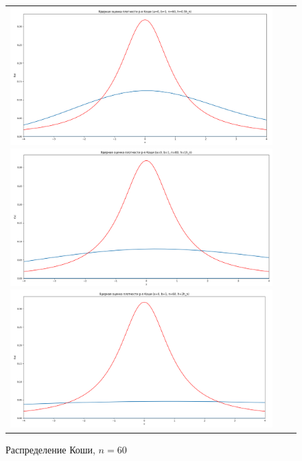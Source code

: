 \begin{figure}[H]
	\begin{tabular}{ccc}
		\includegraphics[scale=0.14]{resources/4_cauchy_60_half.png}
		\includegraphics[scale=0.14]{resources/4_cauchy_60_one.png}
		\includegraphics[scale=0.14]{resources/4_cauchy_60_two.png}
	\end{tabular}
	\caption{Распределение Коши, $n=60$}
\end{figure}

